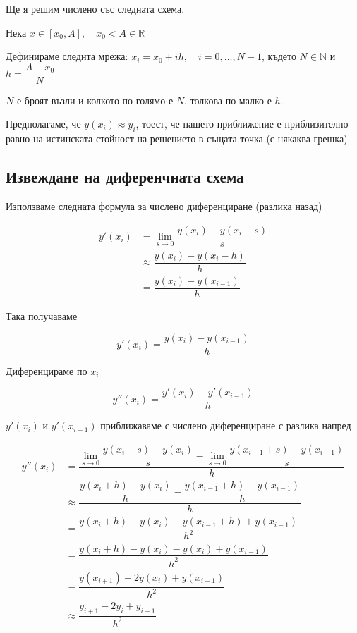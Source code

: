 \documentclass{scrartcl}
\begin{document}
Ще я решим числено със следната схема.

Нека $x\in[x_0, A], \quad x_0<A\in\mathbb{R}$

Дефинираме следнта мрежа: $x_i = x_0 + ih, \quad i = 0,\dots,N-1$, където $N\in\mathbb{N}$ и $h = \dfrac{A-x_0}{N}$

$N$ е броят възли и колкото по-голямо е $N$, толкова по-малко е $h$.

Предполагаме, че $y(x_i) \approx y_i$, тоест, че нашето приближение е приблизително равно на истинската стойност на решението в същата точка (с някаква грешка).

\subsection{Извеждане на диференчната схема}

Използваме следната формула за числено диференциране (разлика назад)

\begin{align*}
y'(x_i)
&= \lim \limits_{s\to 0} \dfrac{y(x_i) - y(x_i-s)}{s}\\
&\approx \dfrac{y(x_i) - y(x_i-h)}{h}\\
&= \dfrac{y(x_i) - y(x_{i-1})}{h}
\end{align*}

Така получаваме

$$y'(x_i) = \dfrac{y(x_i) - y(x_{i-1})}{h}$$

Диференцираме по $x_i$

$$y''(x_i) = \dfrac{y'(x_i) - y'(x_{i-1})}{h}$$

$y'(x_i)$ и $y'(x_{i-1})$ приближаваме с числено диференциране с разлика напред

\begin{align*}
y''(x_i)
&= \dfrac{\lim \limits_{s\to 0} \dfrac{y(x_i+s) - y(x_i)}{s} - \lim \limits_{s\to 0} \dfrac{y(x_{i-1}+s) - y(x_{i-1})}{s}}{h}\\
&\approx \dfrac{\dfrac{y(x_i+h) - y(x_i)}{h} - \dfrac{y(x_{i-1}+h) - y(x_{i-1})}{h}}{h}\\
&= \dfrac{y(x_i+h) - y(x_i) - y(x_{i-1}+h) + y(x_{i-1})}{h^2}\\
&= \dfrac{y(x_i+h) - y(x_{i}) - y(x_{i}) + y(x_{i-1})}{h^2}\\
&= \dfrac{y(x_{i+1}) - 2 y(x_{i}) + y(x_{i-1})}{h^2}\\
&\approx \dfrac{y_{i+1} - 2 y_{i} + y_{i-1}}{h^2}\\
\end{align*}
\end{document}
